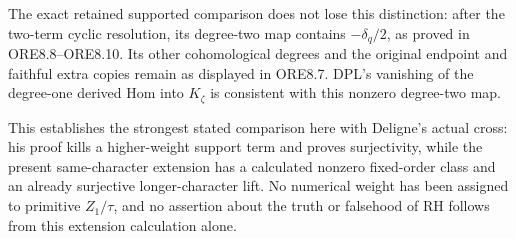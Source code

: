 The exact retained supported comparison does not lose this distinction:
after the two-term cyclic resolution, its degree-two map contains
\(-\delta_q/2\), as proved in ORE8.8--ORE8.10. Its other cohomological
degrees and the original endpoint and faithful extra copies remain as
displayed in ORE8.7. DPL's vanishing of the degree-one derived Hom into
\(K_\zeta\) is consistent with this nonzero degree-two map.

This establishes the strongest stated comparison here with Deligne's
actual cross: his proof kills a higher-weight support term and proves
surjectivity, while the present same-character extension has a
calculated nonzero fixed-order class and an already surjective
longer-character lift. No numerical weight has been assigned to
primitive \(Z_1/\tau\), and no assertion about the truth or falsehood of
RH follows from this extension calculation alone.
